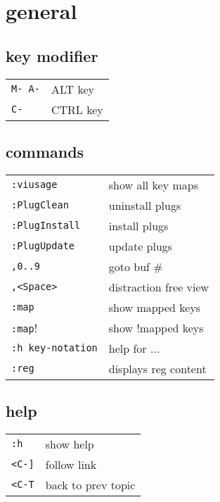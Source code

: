 \section{\hrulefill general\hrulefill}

\subsection{key modifier}
\begin{tabular}{@{}ll@{}}
    \verb!M- A-!        & ALT key \\
    \verb!C-!           & CTRL key \\
\end{tabular}

\subsection{commands}
\begin{tabular}{@{}ll@{}}
    \verb!:viusage!         & show all key maps \\
    \verb!:PlugClean!       & uninstall plugs \\
    \verb!:PlugInstall!     & install plugs \\
    \verb!:PlugUpdate!      & update plugs \\
    \verb!,0..9!            & goto buf \# \\
    \verb!,<Space>!         & distraction free view \\
    \verb!:map!             & show mapped keys \\
    \verb!:map!!            & show !mapped keys \\
    \verb!:h key-notation!  & help for ... \\
    \verb!:reg!             & displays reg content \\
\end{tabular}

\subsection{help}
\begin{tabular}{@{}ll@{}}
    \verb!:h!           & show help \\
    \verb!<C-]!         & follow link \\
    \verb!<C-T!         & back to prev topic \\
\end{tabular}

